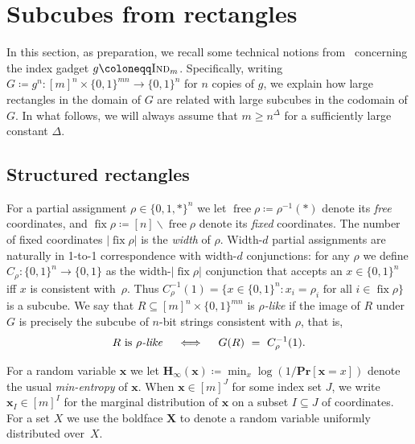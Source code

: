 \documentclass{toc}
\renewcommand{\Pr}{\mathbf{Pr}}
\newcommand{\Hmin}{\mathbf{H}_\infty}
\DeclareMathOperator{\free}{free}
\DeclareMathOperator{\fix}{fix}
\newcommand{\Ind}{\textsc{Ind}}
\newcommand{\x}{\bm{x}}
\newcommand{\X}{\bm{X}}
\newcommand{\allX}{[m]^n}
\newcommand{\allY}{\{0,1\}^{mn}}
\begin{document}
\section{Subcubes from rectangles} \label{sec:tools}

In this section, as preparation, we recall some technical notions from~\cite{goos16rectangles,goos17bpp} concerning the index gadget $g\coloneqq \Ind_m$.
%
Specifically,  %
writing $G\coloneqq g^n\colon\allX\times\allY\to\{0,1\}^n$ for $n$ copies of $g$, we explain how large rectangles in
the domain of $G$ %
are related with large subcubes in
the codomain of $G$. %
In what follows, we will always assume that $m \ge n^\Delta$ for a sufficiently large constant $\Delta$.

\subsection{Structured rectangles}
For a partial assignment $\rho\in\{0,1,*\}^n$ we let $\free\rho\coloneqq \rho^{-1}(*)$ denote its \emph{free} coordinates, and $\fix\rho\coloneqq[n]\smallsetminus\free\rho$ denote its \emph{fixed} coordinates. The number of fixed coordinates $|\!\fix\rho|$ is the \emph{width} of $\rho$. Width-$d$ partial assignments are naturally in 1-to-1 correspondence with width-$d$ conjunctions: for any $\rho$ we define $C_\rho\colon \{0,1\}^n\to\{0,1\}$ as the width-$|\!\fix\rho|$ conjunction that accepts an $x\in\{0,1\}^n$ iff $x$ is consistent with~$\rho$. Thus $C_\rho^{-1}(1)=\{x\in\{0,1\}^n: x_i = \rho_i \text{ for all } i \in \fix\rho\}$ is a subcube. We say that $R\subseteq\allX\times\allY$ is \emph{$\rho$-like} if the image of $R$ under $G$ is precisely the subcube of $n$-bit strings consistent with $\rho$, that is,
\[
R \text{ is \emph{$\rho$-like}}
\quad\iff\quad G(R)~=~C_\rho^{-1}(1).
\]


For a random variable $\x$ we let $\Hmin(\x)\coloneqq\min_x \log(1/\Pr[\x=x])$ denote the usual \emph{min-entropy} of $\x$. When $\x\in[m]^J$ for some index set $J$, we write $\x_I\in[m]^I$ for the marginal distribution of $\x$ on a subset $I\subseteq J$ of coordinates. For a set $X$ we use the boldface $\X$ to denote a random variable uniformly distributed over~$X$.
\end{document}
